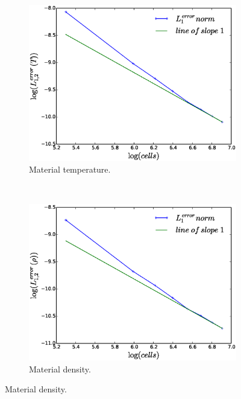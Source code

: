 \documentclass[times,doublespace]{fldauth}%
\begin{document}
\begin{figure}[ht]
    \begin{subfigure}{0.5\textwidth}
    \centering
    \includegraphics[width=\linewidth]{figures/dpt-xs/mach-3-mat-temp-convergence.eps}
    \caption{Material temperature.}\label{fig:mach-3-dpt-xs-temp-conv}
    \end{subfigure}
    ~
    \begin{subfigure}{0.5\textwidth}
    \centering
    \includegraphics[width=\linewidth]{figures/dpt-xs/mach-3-density-convergence.eps}
    \caption{Material density.}\label{fig:mach-3-dpt-xs-density-conv}
    \end{subfigure}
    

\end{figure}
\end{document}
